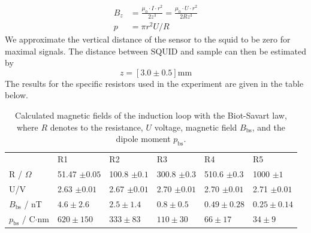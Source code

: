 \begin{align}
B_z     &= \frac{\mu_0\cdot I \cdot r^2}{2z^3} = \frac{\mu_0\cdot U \cdot r^2}{2Rz^3}\\ 
p       &= \pi r^2 U / R 
\end{align}
We approximate the vertical distance of the sensor to the squid to be zero 
for maximal signals. 
The distance between SQUID and sample can then be estimated by
\begin{equation}
z = \left[ 3.0 \pm 0.5 \right]\mathrm{mm}
\end{equation}
The results for the specific resistors used in the experiment are given in the table below. 
\begin{table}[htb]
\caption{
    Calculated magnetic fields of the induction loop with the Biot-Savart law,
    where $R$ denotes to the resistance, $U$ voltage, magnetic field $B_{\mathrm{bs}}$,
    and the dipole moment $p_{\mathrm{bs}}$.
    }
\begin{tabular}{ l| p{2cm}|p{2cm}|p{2cm}|p{2cm}|p{2cm}}
 \rowcolor{tabcolor}& R1 & R2 & R3 & R4 & R5 \\ 
R / $\Omega$ & 51.47  $\pm 0.05$ & 100.8  $\pm 0.1$& 300.8 $\pm 0.3$& 510.6 $\pm 0.3$ & 1000 $\pm 1$\\  
U/V           & 2.63 $\pm 0.01$ & 2.67 $\pm 0.01$& 2.70 $\pm 0.01$& 2.70 $\pm 0.01$& 2.71 $\pm 0.01$\\
$B_{\mathrm{bs}}$ / nT &$4.6 \pm 2.6$&$2.5 \pm 1.4$ &$0.8 \pm 0.5$ &$0.49 \pm 0.28$ &$0.25 \pm 0.14$ \\ 
$p_{\mathrm{bs}}$ / C$\cdot$nm &$620 \pm 150$ &$333 \pm 83$ &$110 \pm 30$ &$66 \pm 17$ &$34 \pm 9$\\
\end{tabular}
\end{table}

